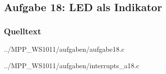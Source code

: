 \subsection*{Aufgabe 18: LED als Indikator}

\subsubsection*{Quelltext}

{../MPP_WS1011/aufgaben/aufgabe18.c}


{../MPP_WS1011/aufgaben/interrupts_a18.c}
